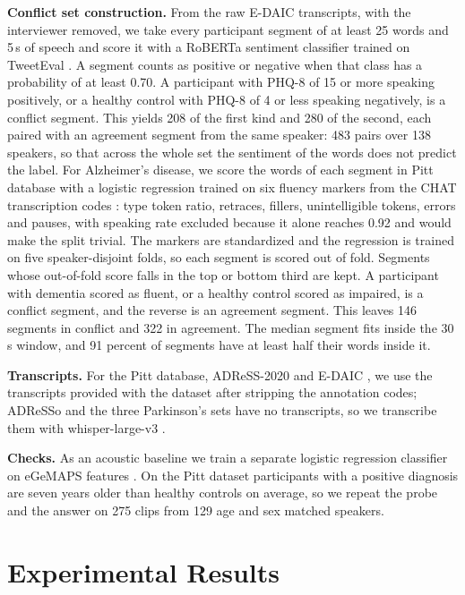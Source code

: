 \documentclass{article}
\begin{document}
\noindent\textbf{Conflict set construction.} From the raw E-DAIC transcripts, with the interviewer removed, we take every participant segment of at least 25 words and 5\,s of speech and score it with a RoBERTa sentiment classifier trained on TweetEval \cite{tweeteval}. A segment counts as positive or negative when that class has a probability of at least 0.70. A participant with PHQ-8 of 15 or more speaking positively, or a healthy control with PHQ-8 of 4 or less speaking negatively, is a conflict segment. This yields 208 of the first kind and 280 of the second, each paired with an agreement segment from the same speaker: 483 pairs over 138 speakers, so that across the whole set the sentiment of the words does not predict the label. For Alzheimer's disease, we score the words of each segment in Pitt database \cite{pitt} with a logistic regression trained on six fluency markers from the CHAT transcription codes \cite{macwhinney2000chat,fraser2016linguistic}: type token ratio, retraces, fillers, unintelligible tokens, errors and pauses, with speaking rate excluded because it alone reaches 0.92 and would make the split trivial. The markers are standardized and the regression is trained on five speaker-disjoint folds, so each segment is scored out of fold. Segments whose out-of-fold score falls in the top or bottom third are kept. A participant with dementia scored as fluent, or a healthy control scored as impaired, is a conflict segment, and the reverse is an agreement segment. This leaves 146 segments in conflict and 322 in agreement. The median segment fits inside the 30\,s window, and 91 percent of segments have at least half their words inside it.

\noindent\textbf{Transcripts.} For the Pitt database, ADReSS-2020 \cite{adress2020} and E-DAIC \cite{daic}, we use the transcripts provided with the dataset after stripping the annotation codes; ADReSSo \cite{adresso} and the three Parkinson's sets have no transcripts, so we transcribe them with whisper-large-v3 \cite{whisper}.

\noindent\textbf{Checks.} As an acoustic baseline we train a separate logistic regression classifier on eGeMAPS features \cite{egemaps}. On the Pitt dataset participants with a positive diagnosis are seven years older than healthy controls on average, so we repeat the probe and the answer on 275 clips from 129 age and sex matched speakers.

\section{Experimental Results}\label{sec:results}
\end{document}
